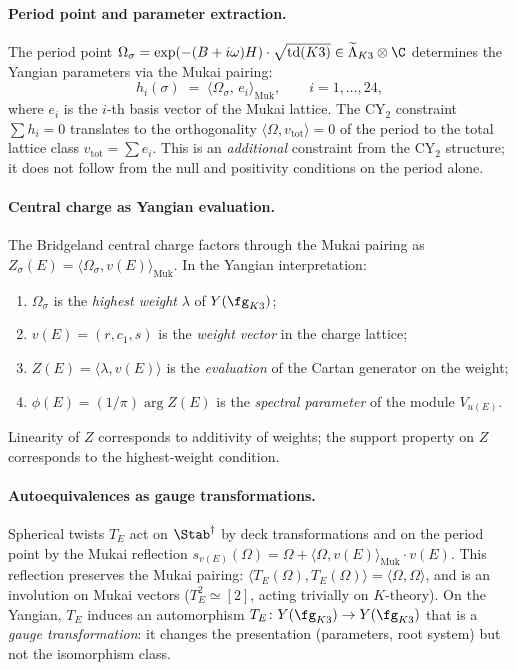 \paragraph{Period point and parameter extraction.}
The period point $\Omega_\sigma = \exp(-(B + i\omega)H) \cdot \sqrt{\mathrm{td}(K3)} \in \widetilde\Lambda_{K3} \otimes \C$ determines the Yangian parameters via the Mukai pairing:
\begin{equation}\label{eq:h-from-period}
 h_i(\sigma) \;=\; \langle \Omega_\sigma,\, e_i \rangle_{\mathrm{Muk}},
 \qquad i = 1, \ldots, 24,
\end{equation}
where $e_i$ is the $i$-th basis vector of the Mukai lattice. The CY$_2$ constraint $\sum h_i = 0$ translates to the orthogonality $\langle \Omega, v_{\mathrm{tot}}\rangle = 0$ of the period to the total lattice class $v_{\mathrm{tot}} = \sum e_i$. This is an \emph{additional} constraint from the CY$_2$ structure; it does not follow from the null and positivity conditions on the period alone.

\paragraph{Central charge as Yangian evaluation.}
The Bridgeland central charge factors through the Mukai pairing as $Z_\sigma(E) = \langle \Omega_\sigma, v(E) \rangle_{\mathrm{Muk}}$. In the Yangian interpretation:
\begin{enumerate}[label=(\roman*)]
\item $\Omega_\sigma$ is the \emph{highest weight} $\lambda$ of $Y(\fg_{K3})$;
\item $v(E) = (r, c_1, s)$ is the \emph{weight vector} in the charge lattice;
\item $Z(E) = \langle \lambda, v(E) \rangle$ is the \emph{evaluation} of the Cartan generator on the weight;
\item $\phi(E) = (1/\pi)\arg Z(E)$ is the \emph{spectral parameter} of the module $V_{u(E)}$.
\end{enumerate}
Linearity of $Z$ corresponds to additivity of weights; the support property on $Z$ corresponds to the highest-weight condition.

\paragraph{Autoequivalences as gauge transformations.}
Spherical twists $T_E$ act on $\Stab^\dagger$ by deck transformations and on the period point by the Mukai reflection $s_{v(E)}(\Omega) = \Omega + \langle \Omega, v(E)\rangle_{\mathrm{Muk}} \cdot v(E)$. This reflection preserves the Mukai pairing: $\langle T_E(\Omega), T_E(\Omega)\rangle = \langle \Omega, \Omega\rangle$, and is an involution on Mukai vectors ($T_E^2 \simeq [2]$, acting trivially on $K$-theory). On the Yangian, $T_E$ induces an automorphism $T_E \colon Y(\fg_{K3}) \to Y(\fg_{K3})$ that is a \emph{gauge transformation}: it changes the presentation (parameters, root system) but not the isomorphism class.

